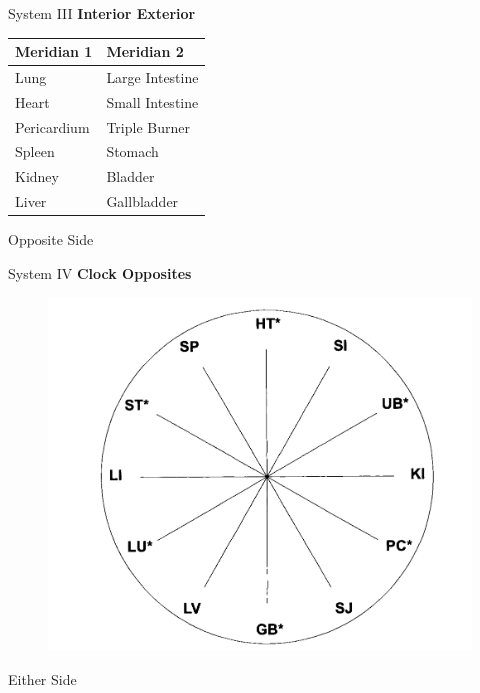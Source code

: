 \begin{frame}{System III}
  \textbf{\Large Interior Exterior}
  \begin{table}[]
    \begin{tabular}{@{}ll@{}}
      \toprule
      Meridian 1  & Meridian 2      \\ \midrule
      Lung        & Large Intestine \\
      Heart       & Small Intestine \\
      Pericardium & Triple Burner   \\
      Spleen      & Stomach         \\
      Kidney      & Bladder         \\
      Liver       & Gallbladder     \\ \bottomrule
    \end{tabular}
  \end{table}

  \begin{ns}
    Opposite Side
  \end{ns}
\end{frame}

\begin{frame}{System IV}
  \textbf{\Large Clock Opposites}

  \begin{figure}
    \centering
    \includegraphics[height=0.5\textheight]{img/mclock.png}
  \end{figure}

  \begin{ns}
    Either Side
  \end{ns}
\end{frame}

